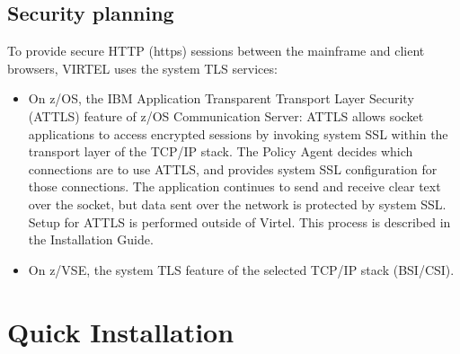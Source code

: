\documentclass[letterpaper,10pt,english]{sphinxmanual}
\begin{document}
\section{Security planning}
\label{\detokenize{Getting_Started:security-planning}}
To provide secure HTTP (https) sessions between the mainframe and client browsers, VIRTEL uses the system TLS services:
\begin{itemize}
\item {} 
On z/OS, the IBM Application Transparent Transport Layer Security (AT\sphinxhyphen{}TLS) feature of z/OS Communication Server: AT\sphinxhyphen{}TLS allows socket applications to access encrypted sessions by invoking system SSL within the transport layer of the TCP/IP stack. The Policy Agent decides which connections are to use AT\sphinxhyphen{}TLS, and provides system SSL configuration for those connections. The application continues to send and receive clear text over the socket, but data sent over the network is protected by system SSL. Setup for AT\sphinxhyphen{}TLS is performed outside of Virtel. This process is described in the Installation Guide.

\item {} 
On z/VSE, the system TLS feature of the selected TCP/IP stack (BSI/CSI).

\end{itemize}


\chapter{Quick Installation}
\label{\detokenize{Getting_Started:quick-installation}}
\end{document}

